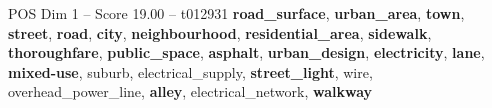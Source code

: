 \begin{textsample}{POS Dim 1 – Score 19.00 – t012931}  \label{ex:f1_pos_019}
\textbf{road\_surface}, \textbf{urban\_area}, \textbf{town}, \textbf{street}, \textbf{road}, \textbf{city}, \textbf{neighbourhood}, \textbf{residential\_area}, \textbf{sidewalk}, \textbf{thoroughfare}, \textbf{public\_space}, \textbf{asphalt}, \textbf{urban\_design}, \textbf{electricity}, \textbf{lane}, \textbf{mixed-use}, suburb, electrical\_supply, \textbf{street\_light}, wire, overhead\_power\_line, \textbf{alley}, electrical\_network, \textbf{walkway}

\end{textsample}
